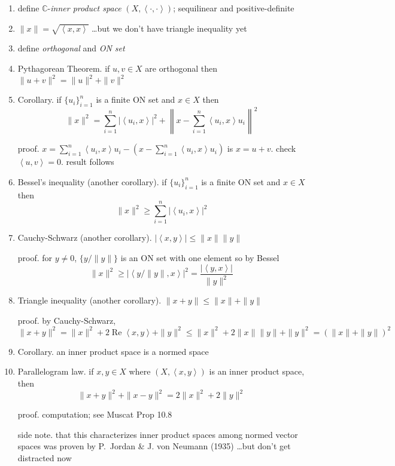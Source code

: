 \documentclass[11pt]{article}
\newcommand{\CC}{\mathbb{C}}
\newcommand{\ip}[2]{\ensuremath{\left<#1,#2\right>}}
\begin{document}
\begin{enumerate}
\renewcommand{\labelenumi}{{\Large \textbf{\Alph{enumi}.}}\,}
\item define $\CC$-\emph{inner product space} $(X,\ip{\cdot}{\cdot})$; sequilinear and positive-definite

\item $\|x\|=\sqrt{\ip{x}{x}}$ \dots but we don't have triangle inequality yet

\item define \emph{orthogonal} and \emph{ON set}

\item Pythagorean Theorem. if $u,v\in X$ are orthogonal then $\|u+v\|^2 = \|u\|^2 + \|v\|^2$

\item Corollary. if $\{u_i\}_{i=1}^n$ is a finite ON set and $x\in X$ then
    $$\|x\|^2 = \sum_{i=1}^n |\ip{u_i}{x}|^2 + \left\|x - \sum_{i=1}^n \ip{u_i}{x} u_i\right\|^2$$

proof. $x = \sum_{i=1}^n \ip{u_i}{x} u_i - \left(x - \sum_{i=1}^n \ip{u_i}{x} u_i\right)$ is $x=u+v$.  check $\ip{u}{v}=0$. result follows

\item Bessel's inequality (another corollary). if $\{u_i\}_{i=1}^n$ is a finite ON set and $x\in X$ then
    $$\|x\|^2 \ge \sum_{i=1}^n |\ip{u_i}{x}|^2$$

\item Cauchy-Schwarz (another corollary). $|\ip{x}{y}| \le \|x\|\|y\|$

proof. for $y\ne 0$, $\{y/\|y\|\}$ is an ON set with one element so by Bessel
    $$\|x\|^2 \ge |\ip{y/\|y\|}{x}|^2 = \frac{|\ip{y}{x}|}{\|y\|^2}$$

\item Triangle inequality (another corollary). $\|x+y\| \le \|x\|+\|y\|$

proof. by Cauchy-Schwarz,
   $$\|x+y\|^2 = \|x\|^2 + 2 \operatorname{Re}\ip{x}{y} + \|y\|^2 \le \|x\|^2 + 2 \|x\|\|y\| + \|y\|^2 = \left(\|x\|+\|y\|\right)^2$$

\item Corollary. an inner product space is a normed space

\item Parallelogram law. if $x,y\in X$ where $(X,\ip{x}{y})$ is an inner product space, then
    $$\|x+y\|^2 + \|x-y\|^2 = 2 \|x\|^2 + 2 \|y\|^2$$

proof. computation; see Muscat Prop 10.8

side note. that this characterizes inner product spaces among normed vector spaces was proven by P.~Jordan \& J. von Neumann (1935) \dots but don't get distracted now


\end{enumerate}
\end{document}
